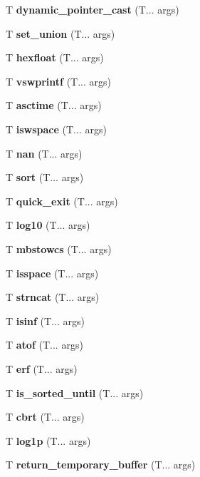 \begin{DoxyCompactItemize}
\mbox{\label{pointer_cast}} 
T \textbf{ dynamic\+\_\+pointer\+\_\+cast} (T... args)
\item 
\mbox{\label{set_union}} 
T \textbf{ set\+\_\+union} (T... args)
\item 
\mbox{\label{fixed}} 
T \textbf{ hexfloat} (T... args)
\item 
\mbox{\label{vfwprintf}} 
T \textbf{ vswprintf} (T... args)
\item 
\mbox{\label{asctime}} 
T \textbf{ asctime} (T... args)
\item 
\mbox{\label{iswspace}} 
T \textbf{ iswspace} (T... args)
\item 
\mbox{\label{nan}} 
T \textbf{ nan} (T... args)
\item 
\mbox{\label{sort}} 
T \textbf{ sort} (T... args)
\item 
\mbox{\label{quick_exit}} 
T \textbf{ quick\+\_\+exit} (T... args)
\item 
\mbox{\label{log10}} 
T \textbf{ log10} (T... args)
\item 
\mbox{\label{mbstowcs}} 
T \textbf{ mbstowcs} (T... args)
\item 
\mbox{\label{isspace}} 
T \textbf{ isspace} (T... args)
\item 
\mbox{\label{strncat}} 
T \textbf{ strncat} (T... args)
\item 
\mbox{\label{isinf}} 
T \textbf{ isinf} (T... args)
\item 
\mbox{\label{atof}} 
T \textbf{ atof} (T... args)
\item 
\mbox{\label{erf}} 
T \textbf{ erf} (T... args)
\item 
\mbox{\label{is_sorted_until}} 
T \textbf{ is\+\_\+sorted\+\_\+until} (T... args)
\item 
\mbox{\label{cbrt}} 
T \textbf{ cbrt} (T... args)
\item 
\mbox{\label{log1p}} 
T \textbf{ log1p} (T... args)
\item 
\mbox{\label{return_temporary_buffer}} 
T \textbf{ return\+\_\+temporary\+\_\+buffer} (T... args)
\item 
\mbox{\label{mbsrtowcs}} 

\end{DoxyCompactItemize}
